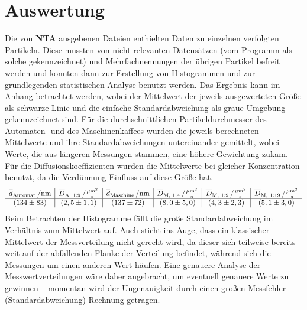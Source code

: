 \documentclass[numbers=noenddot,12pt,a4paper]{scrartcl}
\newcommand{\ix}[1]{_\text{#1}}
\begin{document}
\section{Auswertung}
Die von \textbf{NTA} ausgebenen Dateien enthielten Daten zu einzelnen verfolgten Partikeln. Diese mussten von nicht relevanten Datensätzen (vom Programm als solche gekennzeichnet) und Mehrfachnennungen der übrigen Partikel befreit werden und konnten dann zur Erstellung von Histogrammen und zur grundlegenden statistischen Analyse benutzt werden. Das Ergebnis kann im Anhang betrachtet werden, wobei der Mittelwert der jeweils ausgewerteten Größe als schwarze Linie und die einfache Standardabweichung als graue Umgebung gekennzeichnet sind. Für die durchschnittlichen Partikeldurchmesser des Automaten- und des Maschinenkaffees wurden die jeweils berechneten Mittelwerte und ihre Standardabweichungen untereinander gemittelt, wobei Werte, die aus längeren Messungen stammen, eine höhere Gewichtung zukam. Für die Diffusionskoeffizienten wurden die Mittelwerte bei gleicher Konzentration benutzt, da die Verdünnung Einfluss auf diese Größe hat.
\begin{align*}
\begin{array}{c|c|c|c|c|c}
\unit[\overline{d}\ix{Automat}]{/nm}& \unit[\overline{D}\ix{A, 1:9}]{/\frac{\mu m^2}{s}} & \unit[\overline{d}\ix{Maschine}]{/nm} & \unit[\overline{D}\ix{M, 1:4}]{/\frac{\mu m^2}{s}} & \unit[\overline{D}\ix{M, 1:9}]{/\frac{\mu m^2}{s}} & \unit[\overline{D}\ix{M, 1:19}]{/\frac{\mu m^2}{s}} \\
\hline 
\left(134\pm 83\right)	& \left(2,5\pm 1,1 \right) & \left(137\pm 72\right) & \left(8,0\pm 5,0\right) & \left(4,3\pm 2,3\right) & \left(5,1\pm 3,0\right)
\end{array} 
\end{align*}
Beim Betrachten der Histogramme fällt die große Standardabweichung im Verhältnis zum Mittelwert auf. Auch sticht ins Auge, dass ein klassischer Mittelwert der Messverteilung nicht gerecht wird, da dieser sich teilweise bereits weit auf der abfallenden Flanke der Verteilung befindet, während sich die Messungen um einen anderen Wert häufen. Eine genauere Analyse der Messwertverteilungen wäre daher angebracht, um eventuell genauere Werte zu gewinnen -- momentan wird der Ungenauigkeit durch einen großen Messfehler (Standardabweichung) Rechnung getragen.\\
\end{document}
